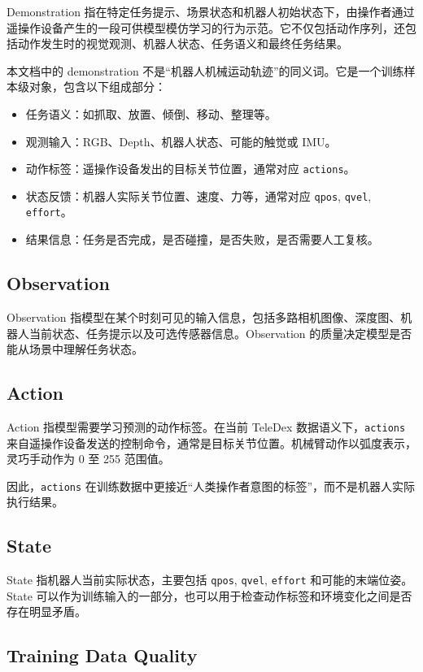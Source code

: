 \documentclass[UTF8,zihao=-4]{ctexart}
\begin{document}
Demonstration 指在特定任务提示、场景状态和机器人初始状态下，由操作者通过遥操作设备产生的一段可供模型模仿学习的行为示范。它不仅包括动作序列，还包括动作发生时的视觉观测、机器人状态、任务语义和最终任务结果。

本文档中的 demonstration 不是“机器人机械运动轨迹”的同义词。它是一个训练样本级对象，包含以下组成部分：

\begin{itemize}
  \item 任务语义：如抓取、放置、倾倒、移动、整理等。
  \item 观测输入：RGB、Depth、机器人状态、可能的触觉或 IMU。
  \item 动作标签：遥操作设备发出的目标关节位置，通常对应 \texttt{actions}。
  \item 状态反馈：机器人实际关节位置、速度、力等，通常对应 \texttt{qpos}, \texttt{qvel}, \texttt{effort}。
  \item 结果信息：任务是否完成，是否碰撞，是否失败，是否需要人工复核。
\end{itemize}

\subsection{Observation}

Observation 指模型在某个时刻可见的输入信息，包括多路相机图像、深度图、机器人当前状态、任务提示以及可选传感器信息。Observation 的质量决定模型是否能从场景中理解任务状态。

\subsection{Action}

Action 指模型需要学习预测的动作标签。在当前 TeleDex 数据语义下，\texttt{actions} 来自遥操作设备发送的控制命令，通常是目标关节位置。机械臂动作以弧度表示，灵巧手动作为 0 至 255 范围值。

因此，\texttt{actions} 在训练数据中更接近“人类操作者意图的标签”，而不是机器人实际执行结果。

\subsection{State}

State 指机器人当前实际状态，主要包括 \texttt{qpos}, \texttt{qvel}, \texttt{effort} 和可能的末端位姿。State 可以作为训练输入的一部分，也可以用于检查动作标签和环境变化之间是否存在明显矛盾。

\subsection{Training Data Quality}
\end{document}
